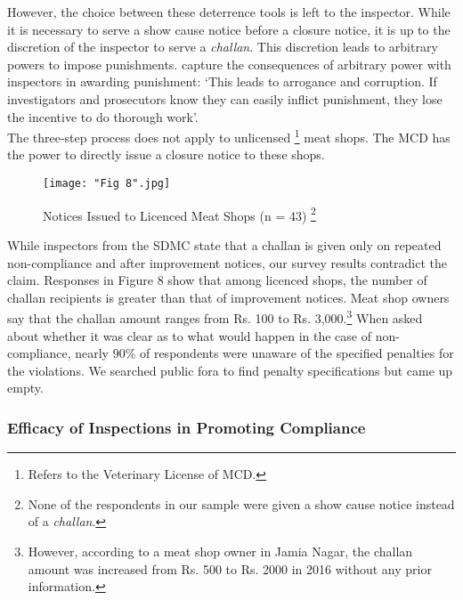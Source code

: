 \documentclass[a4paper, 12pt]{article}
\begin{document}
However, the choice between these deterrence tools is left to the inspector. While it is necessary to serve a show cause notice before a closure notice, it is up to the discretion of the inspector to serve a \textit{challan}. This discretion leads to arbitrary powers to impose punishments. \parencite{roychapter} capture the consequences of arbitrary power with inspectors in awarding punishment: ‘This leads to arrogance and corruption. If investigators and prosecutors know they can easily inflict punishment, they lose the incentive to do thorough work’.\\

The three-step process does not apply to unlicensed \footnote{ Refers to the Veterinary License of MCD.} meat shops. The MCD has the power to directly issue a closure notice to these shops.\\

\begin{figure}[H]
\centering
\texttt{[image: "Fig 8".jpg]}
\caption[Optional Caption]{Notices Issued to Licenced Meat Shops (n = 43) \footnote{None of the respondents in our sample were given a show cause notice instead of a \textit{challan}.}}
\end{figure}

While inspectors from the SDMC state that a challan is given only on repeated non-compliance and after improvement notices, our survey results contradict the claim. Responses in Figure 8 show that among licenced shops, the number of challan recipients is greater than that of improvement notices. Meat shop owners say that the challan amount ranges from Rs. 100 to Rs. 3,000.\footnote{However, according to a meat shop owner in Jamia Nagar, the challan amount was increased from Rs. 500 to Rs. 2000 in 2016 without any prior information.} When asked about whether it was clear as to what would happen in the case of non-compliance, nearly 90\% of respondents were unaware of the specified penalties for the violations. We searched public fora to find penalty specifications but came up empty.\\

\subsubsection{Efficacy of Inspections in Promoting Compliance}
\end{document}
